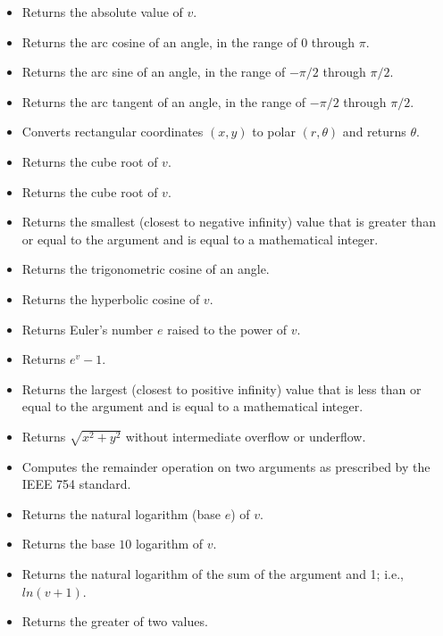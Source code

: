 \documentclass{article}
\begin{document}
\begin{itemize}
\item {\bf {} }   Returns the absolute value of $v$.
\item {\bf {} }   Returns the arc cosine of an angle, in the range of $0$ through $\pi$.
\item {\bf {} }   Returns the arc sine of an angle, in the range of $-\pi/2$ through $\pi/2$.
\item {\bf {} }   Returns the arc tangent of an angle, in the range of $-\pi/2$ through $\pi/2$.
\item {\bf {} }  Converts rectangular coordinates $(x, y)$ to polar $(r, \theta)$ and returns $\theta$.
\item {\bf {} }   Returns the cube root of $v$.
\item {\bf {} }   Returns the cube root of $v$.
\item {\bf {} }   Returns the smallest (closest to negative infinity) value that is greater than or equal to the argument and is equal to a mathematical integer.
\item {\bf {} }   Returns the trigonometric cosine of an angle.
\item {\bf {} }   Returns the hyperbolic cosine of $v$.
\item {\bf {} }   Returns Euler's number $e$ raised to the power of $v$.
\item {\bf {} }   Returns $e^v -1$.
\item {\bf {} }   Returns the largest (closest to positive infinity) value that is less than or equal to the argument and is equal to a mathematical integer.
\item {\bf {} }   Returns $\sqrt{x^2 + y^2}$ without intermediate overflow or underflow.
\item {\bf {} }   Computes the remainder operation on two arguments as prescribed by the IEEE 754 standard.
\item {\bf {} }   Returns the natural logarithm (base $e$) of $v$.
\item {\bf {} }   Returns the base $10$ logarithm of $v$.
\item {\bf {} }   Returns the natural logarithm of the sum of the argument and 1; i.e., $ln(v + 1)$.
\item {\bf {} }   Returns the greater of two values.

\end{itemize}
\end{document}
